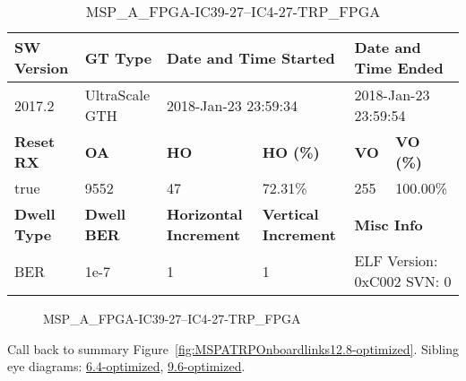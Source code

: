 \begin{table}[h]
\centering
\caption{MSP\_A\_FPGA-IC39-27--IC4-27-TRP\_FPGA}
\label{tab:MSPAFPGAIC3927IC427TRPFPGA12.8-optimized}
\begin{tabular}{@{}|l|l|l|l|l|l|@{}}
\toprule
\textbf{SW Version}                & \textbf{GT Type}   & \multicolumn{2}{l|}{\textbf{Date and Time Started}}            & \multicolumn{2}{l|}{\textbf{Date and Time Ended}}        \\ \midrule
2017.2                       & UltraScale GTH          & \multicolumn{2}{l|}{2018-Jan-23 23:59:34}                   & \multicolumn{2}{l|}{2018-Jan-23 23:59:54}               \\ \midrule
\textbf{Reset RX}                  & \textbf{OA} & \textbf{HO}   & \textbf{HO (\%)} & \textbf{VO} & \textbf{VO (\%)} \\ \midrule
true & 9552        & 47          & 72.31\%        & 255        & 100.00\%       \\ \midrule
\textbf{Dwell Type}                & \textbf{Dwell BER} & \textbf{Horizontal Increment} & \textbf{Vertical Increment}    & \multicolumn{2}{l|}{\textbf{Misc Info}}                  \\ \midrule
BER                            & 1e-7        & 1        & 1           & \multicolumn{2}{l|}{ELF Version: 0xC002 SVN: 0}                         \\ \bottomrule
\end{tabular}
\end{table}

\begin{figure}[h]
\caption{MSP\_A\_FPGA-IC39-27--IC4-27-TRP\_FPGA} \label{fig:MSPAFPGAIC3927IC427TRPFPGA12.8-optimized}
\end{figure}

Call back to summary Figure~\ref{fig:MSPATRPOnboardlinks12.8-optimized}.
Sibling eye diagrams: \hyperref[sec:MSPAFPGAIC3927IC427TRPFPGA6.4-optimized]{6.4-optimized}, \hyperref[sec:MSPAFPGAIC3927IC427TRPFPGA9.6-optimized]{9.6-optimized}.

\clearpage
\newpage

